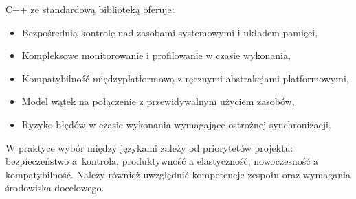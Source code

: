 C++ ze standardową biblioteką oferuje:
\begin{itemize}
    \item Bezpośrednią kontrolę nad zasobami systemowymi i układem pamięci,
    \item Kompleksowe monitorowanie i profilowanie w czasie wykonania,
    \item Kompatybilność międzyplatformową z ręcznymi abstrakcjami platformowymi,
    \item Model wątek na połączenie z przewidywalnym użyciem zasobów,
    \item Ryzyko błędów w czasie wykonania wymagające ostrożnej synchronizacji.
\end{itemize}

W praktyce wybór między językami zależy od priorytetów projektu: bezpieczeństwo a~kontrola, produktywność a elastyczność, nowoczesność a kompatybilność. Należy również uwzględnić kompetencje zespołu oraz wymagania środowiska docelowego.
